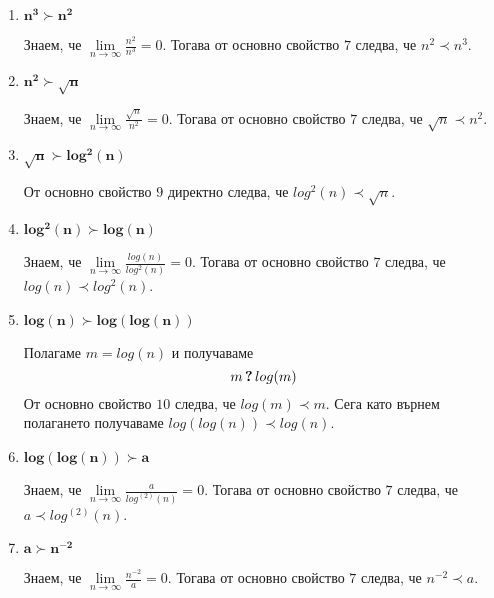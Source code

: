 \begin{solution}
\begin{enumerate}[label=\textbf{\arabic*.}]
		
		\vspace{0.2cm}
		\item $\bm{n^3\succ n^2}$
		
		 Знаем, че $\lim\limits_{n\to\infty}\frac{n^2}{n^3}=0$. Тогава от основно свойство $\hyperref[mprop-1]{7}$ следва, че $n^2\prec n^3$.


		\vspace{0.2cm}
		\item $\bm{n^2\succ\sqrt n}$
		
		Знаем, че $\lim\limits_{n\to\infty}\frac{\sqrt n}{n^2}=0$. Тогава от основно свойство $\hyperref[mprop-1]{7}$ следва, че $\sqrt n\prec n^2$.
		
		
		\vspace{0.2cm}
		\item $\bm{\sqrt n\succ log^2(n)}$
		
		От основно свойство $\hyperref[mprop-1]{9}$ директно следва, че $log^2(n)\prec\sqrt n$.

		
		\vspace{0.2cm}
		\item $\bm{log^2(n)\succ log(n)}$

		Знаем, че $\lim\limits_{n\to\infty}\frac{log(n)}{log^2(n)}=0$. Тогава от основно свойство $\hyperref[mprop-1]{7}$ следва, че $log(n)\prec log^2(n)$.
		
		
		\vspace{0.2cm}
		\item $\bm{log(n)\succ log(log(n))}$
		
		Полагаме $m=log(n)$ и получаваме
		\begin{equation*}
			m\,\textbf?\,log(m)
		\end{equation*}
		От основно свойство $\hyperref[mprop-1]{10}$ следва, че $log(m)\prec m$. Сега като върнем полагането получаваме $log(log(n))\prec log(n)$.
		
		
		\vspace{0.2cm}
		\item $\bm{log(log(n))\succ a}$
		
		Знаем, че $\lim\limits_{n\to\infty}\frac{a}{log^{(2)}(n)}=0$. Тогава от основно свойство $\hyperref[mprop-1]{7}$ следва, че $a\prec log^{(2)}(n)$.
		

		\vspace{0.2cm}
		\item $\bm{a\succ n^{-2}}$

		Знаем, че $\lim\limits_{n\to\infty}\frac{n^{-2}}{a}=0$. Тогава от основно свойство $\hyperref[mprop-1]{7}$ следва, че $n^{-2}\prec a$.
	\end{enumerate}
\end{solution}\leavevmode\newline

